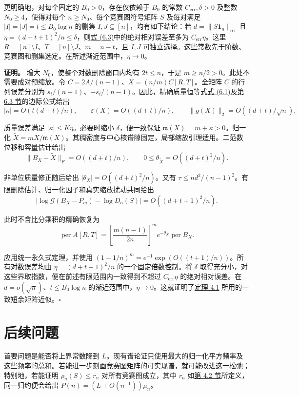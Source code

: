 \documentclass[11pt,a4paper]{article}
\newcommand{\paperref}[2]{\hyperref[#1]{#2}}
\begin{document}
更明确地，对每个固定的 \(B_0>0\)，存在仅依赖于 \(B_0\) 的常数 \(C_{\mathrm{err}},\delta>0\) 及整数 \(N_0\ge4\)，使得对每个 \(n\ge N_0\)、每个竞赛图符号矩阵 \(S\) 及每对满足 \(|I|=|J|=t\le B_0\log n\) 的删集 \(I,J\subseteq[n]\)，均有如下结论：若 \(d=\|S\mathbf1_n\|_\infty\) 且 \(\eta=(d+t+1)^2/n\le\delta\)，则\paperref{eq-small-score-permanent}{式 (6.3)}中的绝对相对误差至多为 \(C_{\mathrm{err}}\eta\)。这里 \(R=[n]\setminus I\)、\(T=[n]\setminus J\)、\(m=n-t\)，且 \(I,J\) 可独立选择。这些常数先于阶数、竞赛图和删集选定。在所述渐近范围中，\(\eta\to0\)。

\textbf{证明。} 增大 \(N_0\)，使整个对数删除窗口内均有 \(2t\le n\)，于是 \(m\ge n/2>0\)。此处不需要成对预缩放。令 \(C=2A/(n-1)\)、\(X=(n/m)C[R,T]\)。全矩阵 \(C\) 的行列误差分别为 \(s_i/(n-1)\)、\(-s_i/(n-1)\)。因此，精确质量恒等式\paperref{eq-deletion-mass}{式 (6.1)}及\paperref{sec-6.3}{第 6.3 节}的边际公式给出
\[|\kappa|=O(t(d+t)/n),\qquad \varepsilon(X)=O((d+t)/n),\qquad \|g(X)\|_2=O((d+t)/\sqrt n).\]

质量误差满足 \(|\kappa|\le K\eta\)。必要时缩小 \(\delta\)，便一致保证 \(\mathfrak m(X)=m+\kappa>0\)。归一化 \(\widetilde X=mX/\mathfrak m(X)\)。其稠密度与中心核谱隙固定，局部缩放引理适用。二范数位移和容量估计给出
\[\|B_X-\widetilde X\|_F=O((d+t)/n),\qquad 0\le\theta_{\widetilde X}=O((d+t)^2/n).\]

非单位质量修正随后给出 \(|\theta_X|=O((d+t)^2/n)\)。又有 \(\tau\le nd^2/(n-1)^2\)。有限删除估计、归一化因子和真实缩放扰动共同给出
\[|\log\mathcal G(B_X-P_m)-\log D_n(S)|=O((d+t+1)^2/n).\]

此时不含比分乘积的精确恢复为
\[\operatorname{per}A[R,T]=\left[\frac{m(n-1)}{2n}\right]^m e^{-\theta_X}\operatorname{per}B_X.\]

应用统一永久式定理，并使用 \((1-1/n)^m=e^{-1}\exp(O((t+1)/n))\)。所有对数误差均由 \(\eta=(d+t+1)^2/n\) 的一个固定倍数控制。将 \(\delta\) 取得充分小，对这些界取指数，便在前述有限范围内一致得到不超过 \(C_{\mathrm{err}}\eta\) 的绝对相对误差。在 \(d=o(\sqrt n)\)、\(t\le B_0\log n\) 的渐近范围中，\(\eta\to0\)。这就证明了\paperref{thm-4.1}{定理 4.1} 所用的一致短余矩阵近似。\nobreak\hspace{.5em}\mbox{$\square$}

\section{后续问题}\label{sec-7}

首要问题是能否将上界常数降到 \(L\)。现有谱论证只使用最大的归一化平方频率及这些频率的总和。若能进一步刻画竞赛图矩阵的可实现谱，就可能改进这一松弛；特别地，若能证明 \(\rho_n(S)\le r_n\) 对所有竞赛图成立，其中 \(r_n\) 如\paperref{sec-4.2}{第 4.2 节}所定义，同一归约便会给出 \(P(n)=(L+O(n^{-1}))\mu_n\)。
\end{document}

